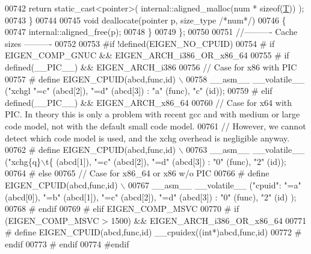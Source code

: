 \begin{DoxyCode}
{00742     \textcolor{keywordflow}{return} \textcolor{keyword}{static\_cast<}pointer\textcolor{keyword}{>}( internal::aligned\_malloc(num * \textcolor{keyword}{sizeof}(\hyperlink{group___sparse_core___module}{T})) );
00743   \}
00744 
00745   \textcolor{keywordtype}{void} deallocate(pointer p, size\_type \textcolor{comment}{/*num*/})
00746   \{
00747     internal::aligned\_free(p);
00748   \}
00749 \};
00750 
00751 \textcolor{comment}{//---------- Cache sizes ----------}
00752 
00753 \textcolor{preprocessor}{#if !defined(EIGEN\_NO\_CPUID)}
00754 \textcolor{preprocessor}{#  if EIGEN\_COMP\_GNUC && EIGEN\_ARCH\_i386\_OR\_x86\_64}
00755 \textcolor{preprocessor}{#    if defined(\_\_PIC\_\_) && EIGEN\_ARCH\_i386}
00756        \textcolor{comment}{// Case for x86 with PIC}
00757 \textcolor{preprocessor}{#      define EIGEN\_CPUID(abcd,func,id) \(\backslash\)}
00758 \textcolor{preprocessor}{         \_\_asm\_\_ \_\_volatile\_\_ ("xchgl %
       "=c" (abcd[2]), "=d" (abcd[3]) : "a" (func), "c" (id));}
00759 \textcolor{preprocessor}{#    elif defined(\_\_PIC\_\_) && EIGEN\_ARCH\_x86\_64}
00760        \textcolor{comment}{// Case for x64 with PIC. In theory this is only a problem with recent gcc and with medium or large
       code model, not with the default small code model.}
00761        \textcolor{comment}{// However, we cannot detect which code model is used, and the xchg overhead is negligible anyway.}
00762 \textcolor{preprocessor}{#      define EIGEN\_CPUID(abcd,func,id) \(\backslash\)}
00763 \textcolor{preprocessor}{        \_\_asm\_\_ \_\_volatile\_\_ ("xchg\{q\}\(\backslash\)t\{%
       (abcd[1]), "=c" (abcd[2]), "=d" (abcd[3]) : "0" (func), "2" (id));}
00764 \textcolor{preprocessor}{#    else}
00765        \textcolor{comment}{// Case for x86\_64 or x86 w/o PIC}
00766 \textcolor{preprocessor}{#      define EIGEN\_CPUID(abcd,func,id) \(\backslash\)}
00767 \textcolor{preprocessor}{         \_\_asm\_\_ \_\_volatile\_\_ ("cpuid": "=a" (abcd[0]), "=b" (abcd[1]), "=c" (abcd[2]), "=d" (abcd[3]) :
       "0" (func), "2" (id) );}
00768 \textcolor{preprocessor}{#    endif}
00769 \textcolor{preprocessor}{#  elif EIGEN\_COMP\_MSVC}
00770 \textcolor{preprocessor}{#    if (EIGEN\_COMP\_MSVC > 1500) && EIGEN\_ARCH\_i386\_OR\_x86\_64}
00771 \textcolor{preprocessor}{#      define EIGEN\_CPUID(abcd,func,id) \_\_cpuidex((int*)abcd,func,id)}
00772 \textcolor{preprocessor}{#    endif}
00773 \textcolor{preprocessor}{#  endif}
00774 \textcolor{preprocessor}{#endif}
}
\end{DoxyCode}
